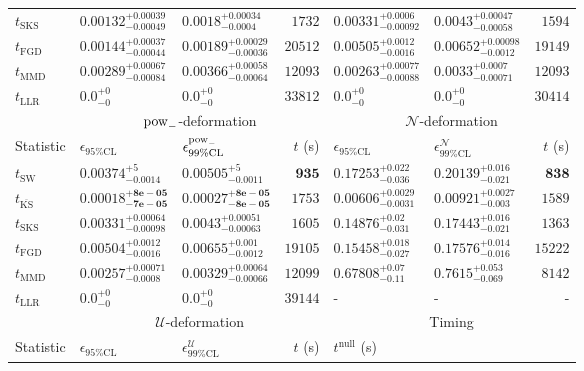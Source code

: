 \begin{tabular}{l|llr|llr}
	$t_{\mathrm{SKS}}$ & $0.00132_{-0.00049}^{+0.00039}$ & $0.0018_{-0.0004}^{+0.00034}$ & $1732$ & $0.00331_{-0.00092}^{+0.0006}$ & $0.0043_{-0.00058}^{+0.00047}$ & $1594$ \\
	$t_{\mathrm{FGD}}$ & $0.00144_{-0.00044}^{+0.00037}$ & $0.00189_{-0.00036}^{+0.00029}$ & $20512$ & $0.00505_{-0.0016}^{+0.0012}$ & $0.00652_{-0.0012}^{+0.00098}$ & $19149$ \\
	$t_{\mathrm{MMD}}$ & $0.00289_{-0.00084}^{+0.00067}$ & $0.00366_{-0.00064}^{+0.00058}$ & $12093$ & $0.00263_{-0.00088}^{+0.00077}$ & $0.0033_{-0.00071}^{+0.0007}$ & $12093$ \\
	$t_{\mathrm{LLR}}$ & $0.0_{-0}^{+0}$ & $0.0_{-0}^{+0}$ & $33812$ & $0.0_{-0}^{+0}$ & $0.0_{-0}^{+0}$ & $30414$ \\
	\toprule
	\multicolumn{1}{c}{} & \multicolumn{3}{c}{$\rm{pow}_{-}$-deformation} & \multicolumn{3}{c}{$\mathcal{N}$-deformation} \\
	Statistic & $\epsilon_{95\%\mathrm{CL}}$ & $\epsilon^  {\rm{pow}_{-}}_{99\%\mathrm{CL}}$ & $t$ (s) & $\epsilon_{95\%\mathrm{CL}}$ & $\epsilon^    {\mathcal{N}}_{99\%\mathrm{CL}}$ & $t$ (s) \\
	\midrule
	$t_{\mathrm{SW}}$ & $0.00374_{-0.0014}^{+5}$ & $0.00505_{-0.0011}^{+5}$ & ${\mathbf{935}}$ & $0.17253_{-0.036}^{+0.022}$ & $0.20139_{-0.021}^{+0.016}$ & ${\mathbf{838}}$ \\
	$t_{\overline{\mathrm{KS}}}$ & ${\mathbf{0.00018_{-7e-05}^{+8e-05}}}$ & ${\mathbf{0.00027_{-8e-05}^{+8e-05}}}$ & $1753$ & ${\mathbf{0.00606_{-0.0031}^{+0.0029}}}$ & ${\mathbf{0.00921_{-0.003}^{+0.0027}}}$ & $1589$ \\
	$t_{\mathrm{SKS}}$ & $0.00331_{-0.00098}^{+0.00064}$ & $0.0043_{-0.00063}^{+0.00051}$ & $1605$ & $0.14876_{-0.031}^{+0.02}$ & $0.17443_{-0.021}^{+0.016}$ & $1363$ \\
	$t_{\mathrm{FGD}}$ & $0.00504_{-0.0016}^{+0.0012}$ & $0.00655_{-0.0012}^{+0.001}$ & $19105$ & $0.15458_{-0.027}^{+0.018}$ & $0.17576_{-0.016}^{+0.014}$ & $15222$ \\
	$t_{\mathrm{MMD}}$ & $0.00257_{-0.0008}^{+0.00071}$ & $0.00329_{-0.00066}^{+0.00064}$ & $12099$ & $0.67808_{-0.11}^{+0.07}$ & $0.7615_{-0.069}^{+0.053}$ & $8142$ \\
	$t_{\mathrm{LLR}}$ & $0.0_{-0}^{+0}$ & $0.0_{-0}^{+0}$ & $39144$ & - & - & - \\
	\toprule
	\multicolumn{1}{c}{} & \multicolumn{3}{c}{$\mathcal{U}$-deformation} & \multicolumn{3}{c}{Timing} \\
	Statistic & $\epsilon_{95\%\mathrm{CL}}$ & $\epsilon^    {\mathcal{U}}_{99\%\mathrm{CL}}$ & $t$ (s) & $t^{\mathrm{null}}$ (s) \\

\end{tabular}
